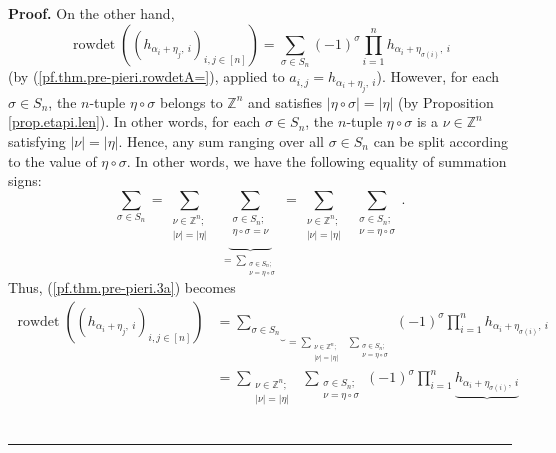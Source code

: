 \documentclass
[numbers=enddot,12pt,final,onecolumn,notitlepage,english]{scrartcl}%
\theoremstyle{definition}
\newenvironment{proof}[1][Proof]{\noindent\textbf{#1.} }{\ \rule{0.5em}{0.5em}}
\let\sumnonlimits\sum
\let\prodnonlimits\prod
\renewcommand{\sum}{\sumnonlimits\limits}
\renewcommand{\prod}{\prodnonlimits\limits}
\newenvironment{verlong}{}{}
\begin{document}
\begin{verlong}
\begin{proof}
On the other hand,%
\begin{equation}
\operatorname*{rowdet}\left(  \left(  h_{\alpha_{i}+\eta_{j},\ i}\right)
_{i,j\in\left[  n\right]  }\right)  =\sum_{\sigma\in S_{n}}\left(  -1\right)
^{\sigma}\prod_{i=1}^{n}h_{\alpha_{i}+\eta_{\sigma\left(  i\right)  },\ i}
\label{pf.thm.pre-pieri.3a}%
\end{equation}
(by (\ref{pf.thm.pre-pieri.rowdetA=}), applied to $a_{i,j}=h_{\alpha_{i}%
+\eta_{j},\ i}$). However, for each $\sigma\in S_{n}$, the $n$-tuple
$\eta\circ\sigma$ belongs to $\mathbb{Z}^{n}$ and satisfies $\left\vert
\eta\circ\sigma\right\vert =\left\vert \eta\right\vert $ (by Proposition
\ref{prop.etapi.len}). In other words, for each $\sigma\in S_{n}$, the
$n$-tuple $\eta\circ\sigma$ is a $\nu\in\mathbb{Z}^{n}$ satisfying $\left\vert
\nu\right\vert =\left\vert \eta\right\vert $. Hence, any sum ranging over all
$\sigma\in S_{n}$ can be split according to the value of $\eta\circ\sigma$. In
other words, we have the following equality of summation signs:%
\[
\sum_{\sigma\in S_{n}}=\sum_{\substack{\nu\in\mathbb{Z}^{n};\\\left\vert
\nu\right\vert =\left\vert \eta\right\vert }}\ \ \underbrace{\sum
_{\substack{\sigma\in S_{n};\\\eta\circ\sigma=\nu}}}_{=\sum_{\substack{\sigma
\in S_{n};\\\nu=\eta\circ\sigma}}}=\sum_{\substack{\nu\in\mathbb{Z}%
^{n};\\\left\vert \nu\right\vert =\left\vert \eta\right\vert }}\ \ \sum
_{\substack{\sigma\in S_{n};\\\nu=\eta\circ\sigma}}.
\]
Thus, (\ref{pf.thm.pre-pieri.3a}) becomes%
\begin{align*}
\operatorname*{rowdet}\left(  \left(  h_{\alpha_{i}+\eta_{j},\ i}\right)
_{i,j\in\left[  n\right]  }\right)   &  =\underbrace{\sum_{\sigma\in S_{n}}%
}_{=\sum_{\substack{\nu\in\mathbb{Z}^{n};\\\left\vert \nu\right\vert
=\left\vert \eta\right\vert }}\ \ \sum_{\substack{\sigma\in S_{n};\\\nu
=\eta\circ\sigma}}}\left(  -1\right)  ^{\sigma}\prod_{i=1}^{n}h_{\alpha
_{i}+\eta_{\sigma\left(  i\right)  },\ i}\\
&  =\sum_{\substack{\nu\in\mathbb{Z}^{n};\\\left\vert \nu\right\vert
=\left\vert \eta\right\vert }}\ \ \sum_{\substack{\sigma\in S_{n};\\\nu
=\eta\circ\sigma}}\left(  -1\right)  ^{\sigma}\prod_{i=1}^{n}%
\underbrace{h_{\alpha_{i}+\eta_{\sigma\left(  i\right)  },\ i}}%

\end{align*}
\end{proof}
\end{verlong}
\end{document}
